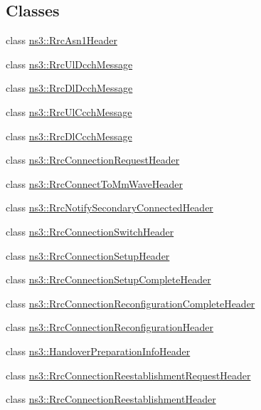 \subsection*{Classes}
\begin{DoxyCompactItemize}
\item 
class \hyperlink{classns3_1_1RrcAsn1Header}{ns3\+::\+Rrc\+Asn1\+Header}
\item 
class \hyperlink{classns3_1_1RrcUlDcchMessage}{ns3\+::\+Rrc\+Ul\+Dcch\+Message}
\item 
class \hyperlink{classns3_1_1RrcDlDcchMessage}{ns3\+::\+Rrc\+Dl\+Dcch\+Message}
\item 
class \hyperlink{classns3_1_1RrcUlCcchMessage}{ns3\+::\+Rrc\+Ul\+Ccch\+Message}
\item 
class \hyperlink{classns3_1_1RrcDlCcchMessage}{ns3\+::\+Rrc\+Dl\+Ccch\+Message}
\item 
class \hyperlink{classns3_1_1RrcConnectionRequestHeader}{ns3\+::\+Rrc\+Connection\+Request\+Header}
\item 
class \hyperlink{classns3_1_1RrcConnectToMmWaveHeader}{ns3\+::\+Rrc\+Connect\+To\+Mm\+Wave\+Header}
\item 
class \hyperlink{classns3_1_1RrcNotifySecondaryConnectedHeader}{ns3\+::\+Rrc\+Notify\+Secondary\+Connected\+Header}
\item 
class \hyperlink{classns3_1_1RrcConnectionSwitchHeader}{ns3\+::\+Rrc\+Connection\+Switch\+Header}
\item 
class \hyperlink{classns3_1_1RrcConnectionSetupHeader}{ns3\+::\+Rrc\+Connection\+Setup\+Header}
\item 
class \hyperlink{classns3_1_1RrcConnectionSetupCompleteHeader}{ns3\+::\+Rrc\+Connection\+Setup\+Complete\+Header}
\item 
class \hyperlink{classns3_1_1RrcConnectionReconfigurationCompleteHeader}{ns3\+::\+Rrc\+Connection\+Reconfiguration\+Complete\+Header}
\item 
class \hyperlink{classns3_1_1RrcConnectionReconfigurationHeader}{ns3\+::\+Rrc\+Connection\+Reconfiguration\+Header}
\item 
class \hyperlink{classns3_1_1HandoverPreparationInfoHeader}{ns3\+::\+Handover\+Preparation\+Info\+Header}
\item 
class \hyperlink{classns3_1_1RrcConnectionReestablishmentRequestHeader}{ns3\+::\+Rrc\+Connection\+Reestablishment\+Request\+Header}
\item 
class \hyperlink{classns3_1_1RrcConnectionReestablishmentHeader}{ns3\+::\+Rrc\+Connection\+Reestablishment\+Header}

\end{DoxyCompactItemize}
